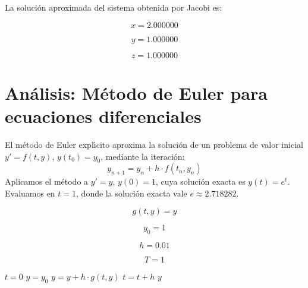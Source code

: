 \documentclass{article}
\begin{document}
La soluci\'on aproximada del sistema obtenida por Jacobi es:

\begin{equation}
    x =
    2.000000
    \label{eq:res:x}
\end{equation}

\begin{equation}
    y =
    1.000000
    \label{eq:res:y}
\end{equation}

\begin{equation}
    z =
    1.000000
    \label{eq:res:z}
\end{equation}


\section{An\'alisis: M\'etodo de Euler para ecuaciones diferenciales}

El m\'etodo de Euler expl\'{\i}cito aproxima la soluci\'on de un problema de valor inicial
$y' = f(t, y)$, $y(t_0) = y_0$, mediante la iteraci\'on:
\[
    y_{n+1} = y_n + h \cdot f(t_n, y_n)
\]
Aplicamos el m\'etodo a $y' = y$, $y(0) = 1$, cuya soluci\'on exacta es $y(t) = e^t$.
Evaluamos en $t = 1$, donde la soluci\'on exacta vale $e \approx 2.718282$.

\begin{equation}
    g(t, y) = y
    \label{eq:calc:g}
\end{equation}

\begin{equation}
    y_0 = 1
    \label{eq:calc:y0}
\end{equation}

\begin{equation}
    h = 0.01
    \label{eq:calc:h}
\end{equation}

\begin{equation}
    T = 1
    \label{eq:calc:T}
\end{equation}

\begin{algorithm}
\caption{M\'etodo de Euler para $y' = y$, $y(0) = 1$}
\label{alg:calc:y}
\begin{algorithmic}
    \STATE $t = 0$
    \STATE $y = y_0$
        \STATE $y = y + h \cdot g(t, y)$
        \STATE $t = t + h$
    \ENDWHILE
    \RETURN $y$
\end{algorithmic}
\end{algorithm}
\end{document}
